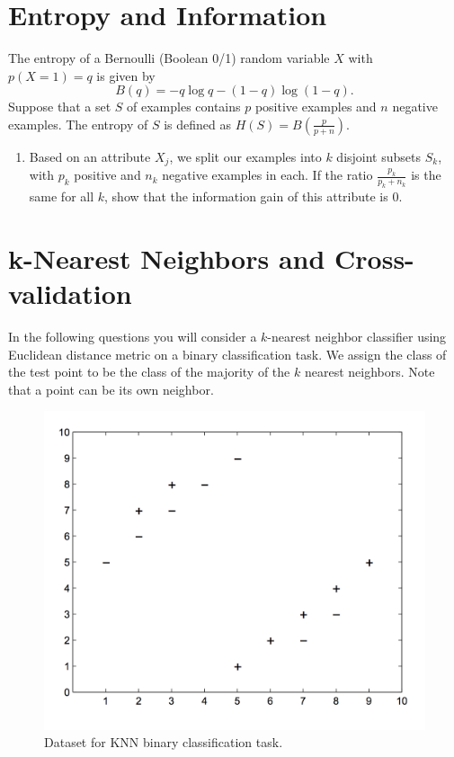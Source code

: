 \documentclass[11pt]{article}
\begin{document}
\section{Entropy and Information }
The entropy of a Bernoulli (Boolean 0/1) random variable $X$ with $p(X = 1) = q$ is given by
\begin{equation*}
B(q) = - q \log q - (1 - q) \log(1 - q).
\end{equation*}
Suppose that a set $S$ of examples contains $p$ positive examples and $n$ negative examples. The entropy of $S$ is defined as $H(S) = B\left(\frac{p}{p+n}\right)$.
\begin{enumerate}
\item {} Based on an attribute $X_j$, we split our examples into $k$ disjoint subsets $S_k$, with $p_k$ positive and $n_k$ negative examples in each. If the ratio $\tfrac{p_k}{p_k + n_k}$ is the same for all $k$, show that the information gain of this attribute is 0.

\end{enumerate}

\section{k-Nearest Neighbors and Cross-validation }
In the following questions you will consider a $k$-nearest neighbor classifier using Euclidean
distance metric on a binary classification task. 
We assign the class of the test point to be the
class of the majority of the $k$ nearest neighbors. 
Note that a point can be its own neighbor.
\begin{figure}[h]
    \centering
    \includegraphics[scale=0.45]{knn_figure.png}
    \caption{Dataset for KNN binary classification task.}
    \label{fig:knn}
\end{figure}
\end{document}
